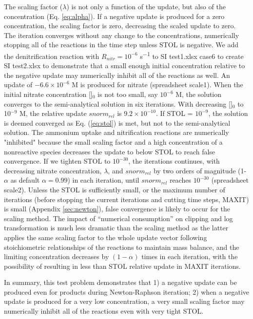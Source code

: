 \documentclass[gmd, manuscript]{copernicus}
\begin{document}
The scaling factor ($\lambda$) is not only a function of the update, but also
of the  concentration (Eq. \ref{eq:alpha}). If a negative update is produced
for a zero concentration, the scaling factor is zero, decreasing the scaled
update to zero. The iteration converges without any change to the
concentrations, numerically stopping all of the reactions in the time step unless
STOL is negative. We add  the denitrification reaction with $R_{nitr} =
10^{-6}$ \unit{s^{-1}} to SI test1.xlsx case6 to create SI test2.xlsx to
demonstrate that a small enough initial concentration relative to the negative
update may numerically inhibit all of the reactions as well.
An update of $-6.6 \times 10^{-6}$ \unit{M} is produced for nitrate
(spreadsheet scale1). When the initial nitrate concentration []$_0$
is not too small, say $10^{-6}$ \unit{M}, the solution converges to the semi-analytical
solution in six iterations. With decreasing []$_0$ to 10$^{-9}$
\unit{M}, the relative update $snorm_{rel}$ is $9.2\times 10^{-10}$. If STOL =
$10^{-9}$, the solution is deemed converged as Eq. (\ref{eq:stol}) is met, but
not to the semi-analytical solution. The ammonium uptake and nitrification
reactions are numerically "inhibited" because the small scaling factor and a
high concentration of a nonreactive species decreases the update to
below STOL to reach false convergence. If we tighten STOL to $10^{-30}$, the
iterations continues, with decreasing nitrate concentration, $\lambda$, and
$snorm_{rel}$ by two orders of magnitude (1-$\alpha$ as default $\alpha=0.99$) in each
iteration, until $snorm_{rel}$  reaches $10^{-30}$ (spreadsheet scale2). Unless the STOL is
sufficiently small, or the maximum number of iterations (before stopping the
current iterations and cutting time steps, MAXIT) is small (Appendix
\ref{sec:newton}), false convergence is likely to occur for the scaling method. The impact of
``numerical consumption'' on clipping and log transformation is much less
dramatic than the scaling method as the latter applies the same scaling factor
to the whole update vector following stoichiometric relationships of the
reactions to maintain mass balance, and the limiting concentration decreases by
$(1-\alpha)$ times in each iteration, with the possibility of resulting in less
than STOL relative update in MAXIT iterations.  

In summary, this test problem demonstrates that 1) a negative update can be
produced even for products during Newton-Raphson iteration; 2) when a negative
update is produced for a very low concentration, a very small scaling factor
may numerically inhibit all of the reactions even with very tight STOL.
\end{document}
